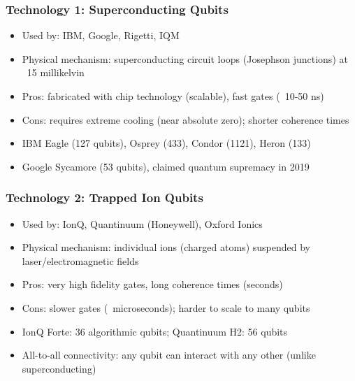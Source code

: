 \begin{frame}[fragile]\frametitle{Technology 1: Superconducting Qubits}
\begin{itemize}
\item Used by: IBM, Google, Rigetti, IQM
\item Physical mechanism: superconducting circuit loops (Josephson junctions) at ~15 millikelvin
\item Pros: fabricated with chip technology (scalable), fast gates (~10-50 ns)
\item Cons: requires extreme cooling (near absolute zero); shorter coherence times
\item IBM Eagle (127 qubits), Osprey (433), Condor (1121), Heron (133)
\item Google Sycamore (53 qubits), claimed quantum supremacy in 2019
\end{itemize}
\end{frame}

\begin{frame}[fragile]\frametitle{Technology 2: Trapped Ion Qubits}
\begin{itemize}
\item Used by: IonQ, Quantinuum (Honeywell), Oxford Ionics
\item Physical mechanism: individual ions (charged atoms) suspended by laser/electromagnetic fields
\item Pros: very high fidelity gates, long coherence times (seconds)
\item Cons: slower gates (~microseconds); harder to scale to many qubits
\item IonQ Forte: 36 algorithmic qubits; Quantinuum H2: 56 qubits
\item All-to-all connectivity: any qubit can interact with any other (unlike superconducting)
\end{itemize}
\end{frame}

